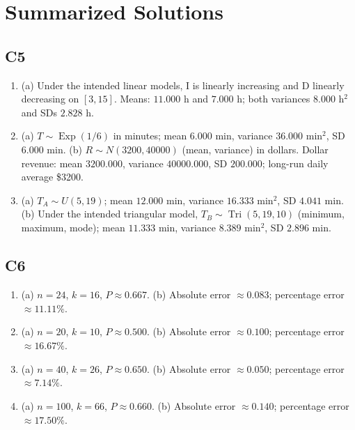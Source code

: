 {\newpage
\section{Summarized Solutions}
\subsection*{C5}
\begin{enumerate}[label=\textbf{C5.\arabic*.}]
\item (a) Under the intended linear models, I is linearly increasing and D linearly decreasing on $[3,15]$.
Means: $11.000$ h and $7.000$ h; both variances $8.000$ h$^2$ and SDs $2.828$ h.
\item (a) $T\sim\operatorname{Exp}(1/6)$ in minutes; mean $6.000$ min,
variance $36.000$ min$^2$, SD $6.000$ min.
(b) $R\sim N(3200,40000)$ (mean, variance) in dollars.
Dollar revenue: mean $3200.000$, variance $40000.000$, SD $200.000$;
long-run daily average \$3200.
\item (a) $T_A\sim U(5,19)$; mean $12.000$ min, variance $16.333$ min$^2$, SD $4.041$ min.
(b) Under the intended triangular model, $T_B\sim\operatorname{Tri}(5,19,10)$ (minimum, maximum, mode);
mean $11.333$ min, variance $8.389$ min$^2$, SD $2.896$ min.
\end{enumerate}
\subsection*{C6}
\begin{enumerate}[label=\textbf{C6.\arabic*.}]
\item (a) $n=24$, $k=16$, $\widehat P\approx0.667$.
(b) Absolute error $\approx0.083$; percentage error $\approx11.11\%$.
\item (a) $n=20$, $k=10$, $\widehat P\approx0.500$.
(b) Absolute error $\approx0.100$; percentage error $\approx16.67\%$.
\item (a) $n=40$, $k=26$, $\widehat P\approx0.650$.
(b) Absolute error $\approx0.050$; percentage error $\approx7.14\%$.
\item (a) $n=100$, $k=66$, $\widehat P\approx0.660$.
(b) Absolute error $\approx0.140$; percentage error $\approx17.50\%$.
\end{enumerate}
}
